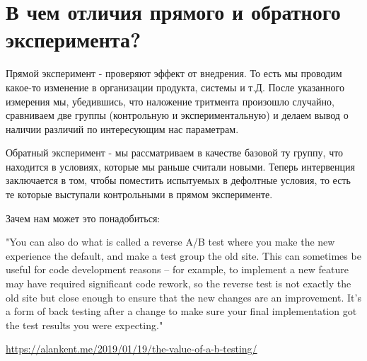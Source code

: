\section{В чем отличия прямого и обратного эксперимента?}

Прямой эксперимент - проверяют эффект от внедрения. То есть мы проводим какое-то изменение в организации продукта, системы и т.Д. После указанного измерения мы, убедившись, что наложение тритмента произошло случайно, сравниваем две группы (контрольную и экспериментальную)  и делаем вывод о наличии различий по интересующим нас параметрам. 

Обратный эксперимент - мы рассматриваем в качестве базовой ту группу, что находится в условиях, которые мы раньше считали новыми. Теперь интервенция заключается в том, чтобы поместить испытуемых в дефолтные условия, то есть те которые выступали контрольными в прямом эксперименте. 

Зачем нам может это понадобиться:

"You can also do what is called a reverse A/B test where you make the new experience the default, and make a test group the old site. This can sometimes be useful for code development reasons – for example, to implement a new feature may have required significant code rework, so the reverse test is not exactly the old site but close enough to ensure that the new changes are an improvement. It’s a form of back testing after a change to make sure your final implementation got the test results you were expecting." 

\url{https://alankent.me/2019/01/19/the-value-of-a-b-testing/}
